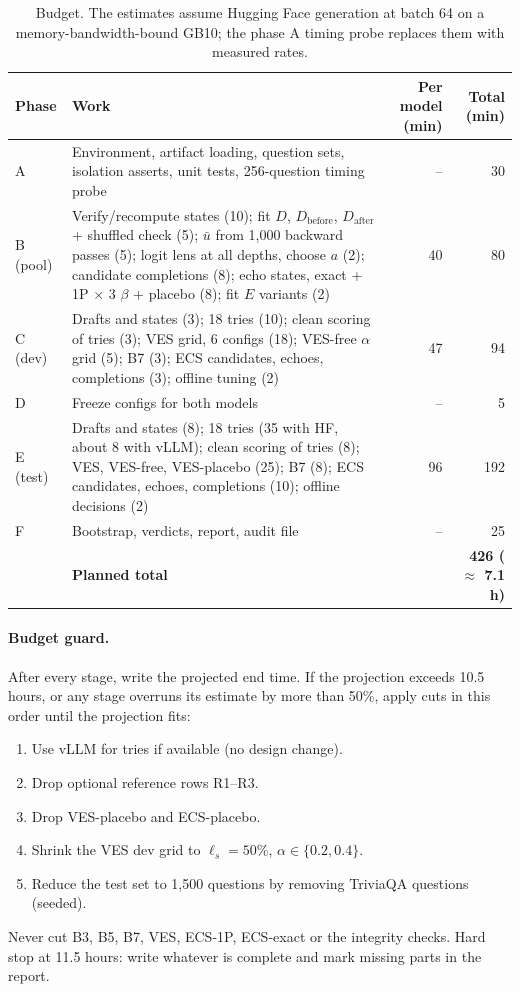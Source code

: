 \documentclass[11pt]{article}
\begin{document}
\begin{table}[H]
\centering
\small
\begin{tabularx}{\textwidth}{@{}lLrr@{}}
\toprule
Phase & Work & Per model (min) & Total (min) \\
\midrule
A & Environment, artifact loading, question sets, isolation asserts, unit tests, 256-question timing probe & -- & 30 \\
B (pool) & Verify/recompute states (10); fit $D$, $D_{\mathrm{before}}$, $D_{\mathrm{after}}$ + shuffled check (5);
           $\bar u$ from 1,000 backward passes (5); logit lens at all depths, choose $a$ (2); candidate
           completions (8); echo states, exact + 1P $\times$ 3 $\beta$ + placebo (8); fit $E$ variants (2) & 40 & 80 \\
C (dev) & Drafts and states (3); 18 tries (10); clean scoring of tries (3); VES grid, 6 configs (18);
          VES-free $\alpha$ grid (5); B7 (3); ECS candidates, echoes, completions (3); offline tuning (2) & 47 & 94 \\
D & Freeze configs for both models & -- & 5 \\
E (test) & Drafts and states (8); 18 tries (35 with HF, about 8 with vLLM); clean scoring of tries (8); VES,
           VES-free, VES-placebo (25); B7 (8); ECS candidates, echoes, completions (10); offline decisions (2) & 96 & 192 \\
F & Bootstrap, verdicts, report, audit file & -- & 25 \\
\midrule
 & \textbf{Planned total} & & \textbf{426 ($\approx$ 7.1 h)} \\
\bottomrule
\end{tabularx}
\caption{Budget. The estimates assume Hugging Face generation at batch 64 on a memory-bandwidth-bound GB10;
the phase A timing probe replaces them with measured rates.}
\end{table}

\paragraph{Budget guard.} After every stage, write the projected end time. If the projection exceeds 10.5 hours,
or any stage overruns its estimate by more than 50\%, apply cuts in this order until the projection fits:
\begin{enumerate}
  \item Use vLLM for tries if available (no design change).
  \item Drop optional reference rows R1--R3.
  \item Drop VES-placebo and ECS-placebo.
  \item Shrink the VES dev grid to $\ell_s = 50\%$, $\alpha \in \{0.2, 0.4\}$.
  \item Reduce the test set to 1,500 questions by removing TriviaQA questions (seeded).
\end{enumerate}
Never cut B3, B5, B7, VES, ECS-1P, ECS-exact or the integrity checks. Hard stop at 11.5 hours: write whatever is
complete and mark missing parts in the report.
\end{document}
